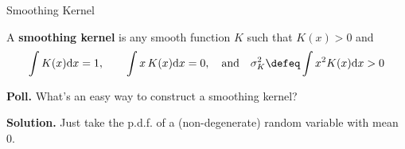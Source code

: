 \documentclass[10pt]{beamer}
\newcommand{\kernel}{K}
\begin{document}
\begin{frame}{Smoothing Kernel}

\begin{mybluebox}[title=Definition]
A \textbf{smoothing kernel} is any smooth function $\kernel$ such that $\kernel(x)>0$ and
%
\begin{align*}
\int \kernel(x) \text{d}x=1, \qquad 	\int x \, \kernel(x) \text{d}x=0, \quad \text{and} \quad \sigma^2_\kernel \defeq \int x^2 \kernel(x) \text{d}x >0 
\end{align*}
\end{mybluebox}

\pause 
\colorbox{yellow!30}{\textbf{Poll.}} What's an easy way to construct a smoothing kernel?

\pause 
\vfill 
\colorbox{green!30}{\textbf{Solution.}} Just take the p.d.f. of a (non-degenerate) random variable with mean 0.



\end{frame}




%	
%
%
%
%
%
%
\end{document}
